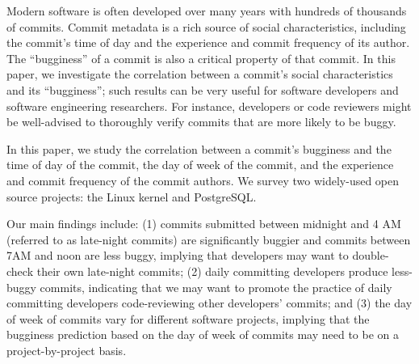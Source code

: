 
Modern software is often developed over many years with hundreds of
thousands of commits. Commit metadata is a rich source of social
characteristics, including the commit's time of day and the
experience and commit frequency of its author.  The ``bugginess'' of a
commit is also a critical property of that commit. In this paper, we
investigate the correlation between a commit's social characteristics
and its ``bugginess''; such results can be very useful for software
developers and software engineering researchers. For instance,
developers or code reviewers might be well-advised to thoroughly
verify commits that are more likely to be buggy.

In this paper, we study the correlation between a commit's bugginess
and the time of day of the commit, the day of week of the commit, and
the experience and commit frequency of the commit authors.  We
survey two widely-used open source projects: the Linux kernel and
PostgreSQL.  

Our main findings include: (1) commits submitted between midnight and
4 AM (referred to as late-night commits) are significantly buggier 
and commits between 7AM and noon are less buggy, implying that developers 
may want to double-check their own late-night commits; 
(2) daily committing developers produce less-buggy commits, indicating that we may 
want to promote the practice of daily committing developers code-reviewing other 
developers' commits; and (3) 
the day of week of commits
vary for different software projects, implying that the bugginess prediction based on 
the day of week of commits may need to be on a project-by-project basis.
